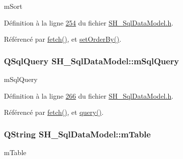 m\-Sort 



Définition à la ligne \hyperlink{SH__SqlDataModel_8h_source_l00254}{254} du fichier \hyperlink{SH__SqlDataModel_8h_source}{S\-H\-\_\-\-Sql\-Data\-Model.\-h}.



Référencé par \hyperlink{classSH__SqlDataModel_ab6c206088250a66ddc8cb8d33a38e421}{fetch()}, et \hyperlink{classSH__SqlDataModel_ab443cd7935993270c37f9bd977b33875}{set\-Order\-By()}.

\hypertarget{classSH__SqlDataModel_a54f0cf057e3200f6b199508958e43fec}{
\subsubsection[{m\-Sql\-Query}]{\setlength{\rightskip}{0pt plus 5cm}Q\-Sql\-Query S\-H\-\_\-\-Sql\-Data\-Model\-::m\-Sql\-Query\hspace{0.3cm}{\ttfamily [private]}}}\label{classSH__SqlDataModel_a54f0cf057e3200f6b199508958e43fec}


m\-Sql\-Query 



Définition à la ligne \hyperlink{SH__SqlDataModel_8h_source_l00266}{266} du fichier \hyperlink{SH__SqlDataModel_8h_source}{S\-H\-\_\-\-Sql\-Data\-Model.\-h}.



Référencé par \hyperlink{classSH__SqlDataModel_ab6c206088250a66ddc8cb8d33a38e421}{fetch()}, et \hyperlink{classSH__SqlDataModel_aee909d0a29715d02d920fcf854bfbba2}{query()}.

\hypertarget{classSH__SqlDataModel_a88b8738a0d2803c94295c90c83d65f32}{
\subsubsection[{m\-Table}]{\setlength{\rightskip}{0pt plus 5cm}Q\-String S\-H\-\_\-\-Sql\-Data\-Model\-::m\-Table\hspace{0.3cm}{\ttfamily [private]}}}\label{classSH__SqlDataModel_a88b8738a0d2803c94295c90c83d65f32}


m\-Table 



